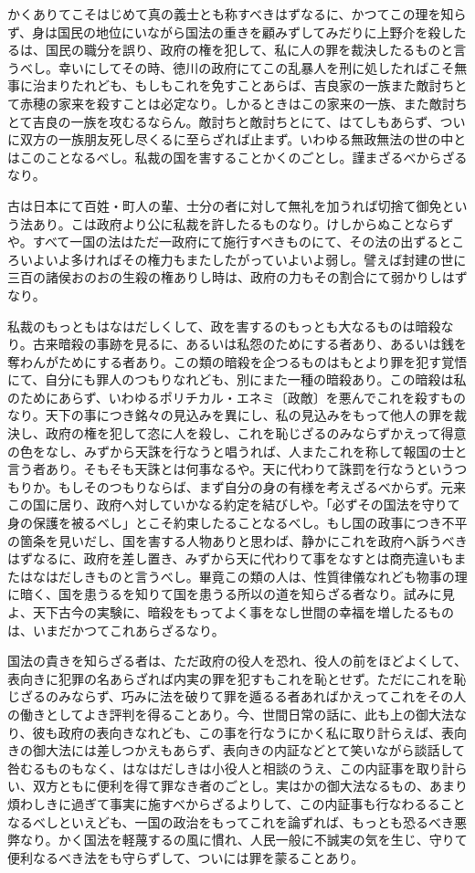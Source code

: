 \documentclass[a4paper, platex, dvipdfmx]{jsarticle}
\begin{document}
かくありてこそはじめて真の義士とも称すべきはずなるに、かつてこの理を知らず、身は国民の地位にいながら国法の重きを顧みずしてみだりに上野介を殺したるは、国民の職分を誤り、政府の権を犯して、私に人の罪を裁決したるものと言うべし。幸いにしてその時、徳川の政府にてこの乱暴人を刑に処したればこそ無事に治まりたれども、もしもこれを免すことあらば、吉良家の一族また敵討ちとて赤穂の家来を殺すことは必定なり。しかるときはこの家来の一族、また敵討ちとて吉良の一族を攻むるならん。敵討ちと敵討ちとにて、はてしもあらず、ついに双方の一族朋友死し尽くるに至らざれば止まず。いわゆる無政無法の世の中とはこのことなるべし。私裁の国を害することかくのごとし。謹まざるべからざるなり。

古は日本にて百姓・町人の輩、士分の者に対して無礼を加うれば切捨て御免という法あり。こは政府より公に私裁を許したるものなり。けしからぬことならずや。すべて一国の法はただ一政府にて施行すべきものにて、その法の出ずるところいよいよ多ければその権力もまたしたがっていよいよ弱し。譬えば封建の世に三百の諸侯おのおの生殺の権ありし時は、政府の力もその割合にて弱かりしはずなり。

私裁のもっともはなはだしくして、政を害するのもっとも大なるものは暗殺なり。古来暗殺の事跡を見るに、あるいは私怨のためにする者あり、あるいは銭を奪わんがためにする者あり。この類の暗殺を企つるものはもとより罪を犯す覚悟にて、自分にも罪人のつもりなれども、別にまた一種の暗殺あり。この暗殺は私のためにあらず、いわゆるポリチカル・エネミ〔政敵〕を悪んでこれを殺すものなり。天下の事につき銘々の見込みを異にし、私の見込みをもって他人の罪を裁決し、政府の権を犯して恣に人を殺し、これを恥じざるのみならずかえって得意の色をなし、みずから天誅を行なうと唱うれば、人またこれを称して報国の士と言う者あり。そもそも天誅とは何事なるや。天に代わりて誅罰を行なうというつもりか。もしそのつもりならば、まず自分の身の有様を考えざるべからず。元来この国に居り、政府へ対していかなる約定を結びしや。「必ずその国法を守りて身の保護を被るべし」とこそ約束したることなるべし。もし国の政事につき不平の箇条を見いだし、国を害する人物ありと思わば、静かにこれを政府へ訴うべきはずなるに、政府を差し置き、みずから天に代わりて事をなすとは商売違いもまたはなはだしきものと言うべし。畢竟この類の人は、性質律儀なれども物事の理に暗く、国を患うるを知りて国を患うる所以の道を知らざる者なり。試みに見よ、天下古今の実験に、暗殺をもってよく事をなし世間の幸福を増したるものは、いまだかつてこれあらざるなり。

国法の貴きを知らざる者は、ただ政府の役人を恐れ、役人の前をほどよくして、表向きに犯罪の名あらざれば内実の罪を犯すもこれを恥とせず。ただにこれを恥じざるのみならず、巧みに法を破りて罪を遁るる者あればかえってこれをその人の働きとしてよき評判を得ることあり。今、世間日常の話に、此も上の御大法なり、彼も政府の表向きなれども、この事を行なうにかく私に取り計らえば、表向きの御大法には差しつかえもあらず、表向きの内証などとて笑いながら談話して咎むるものもなく、はなはだしきは小役人と相談のうえ、この内証事を取り計らい、双方ともに便利を得て罪なき者のごとし。実はかの御大法なるもの、あまり煩わしきに過ぎて事実に施すべからざるよりして、この内証事も行なわるることなるべしといえども、一国の政治をもってこれを論ずれば、もっとも恐るべき悪弊なり。かく国法を軽蔑するの風に慣れ、人民一般に不誠実の気を生じ、守りて便利なるべき法をも守らずして、ついには罪を蒙ることあり。
\end{document}
